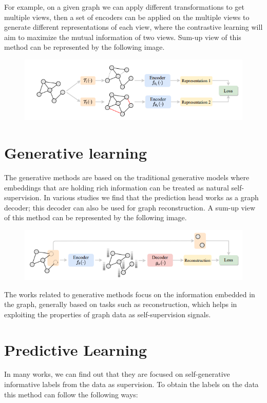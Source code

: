 \documentclass[a4paper,11pt]{report}
\begin{document}
For example, on a given graph we can apply different transformations to get multiple views, then a set of encoders can be applied on the multiple views to generate different representations of each view, where the contrastive learning will aim to maximize the mutual information of two views. Sum-up view of this method can be represented by the following image.

\begin{figure}[h]
	\centering
	\hspace{21pt}
	\includegraphics[width=.70\linewidth]{ssgnn4.png}
	\label{fig:he.jpg}
\end{figure}
\section{Generative learning}
The generative methods are based on the traditional generative models where embeddings that are holding rich information can be treated as natural self-supervision. In various studies we find that the prediction head works as a graph decoder; this decoder can also be used for graph reconstruction. A sum-up view of this method can be represented by the following image.
\begin{figure}[h]
	\centering
	\hspace{21pt}
	\includegraphics[width=.70\linewidth]{ssgnn5.png}
	\label{fig:he.jpg}
\end{figure}

The works related to generative methods focus on the information embedded in the graph, generally based on tasks such as reconstruction, which helps in exploiting the properties of graph data as self-supervision signals.

\section{Predictive Learning}
In many works, we can find out that they are focused on self-generative informative labels from the data as supervision. To obtain the labels on the data this method can follow the following ways:
\end{document}
